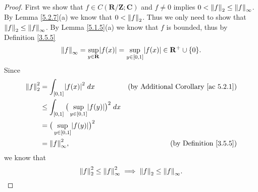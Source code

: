 \begin{proof}
    First we show that \(f \in C(\mathbf{R} / \mathbf{Z} ; \mathbf{C})\) and \(f \neq 0\) implies \(0 < \norm*{f}_2 \leq \norm*{f}_{\infty}\).
    By Lemma \ref{5.2.7}(a) we know that \(0 < \norm*{f}_2\).
    Thus we only need to show that \(\norm*{f}_2 \leq \norm*{f}_\infty\).
    By Lemma \ref{5.1.5}(a) we know that \(f\) is bounded, thus by Definition \ref{3.5.5}
    \[
        \norm*{f}_{\infty} = \sup_{y \in \mathbf{R}} \abs*{f(x)} = \sup_{y \in [0, 1]} \abs*{f(x)} \in \mathbf{R}^+ \cup \{0\}.
    \]
    Since
    \begin{align*}
        \norm*{f}_2^2 & = \int_{[0, 1]} \abs*{f(x)}^2 \; dx                                  & \text{(by Additional Corollary \ref{ac 5.2.1})} \\
                      & \leq \int_{[0, 1]} \big(\sup_{y \in [0, 1]} \abs*{f(y)}\big)^2 \; dx                                                   \\
                      & = \big(\sup_{y \in [0, 1]} \abs*{f(y)}\big)^2                                                                          \\
                      & = \norm*{f}_{\infty}^2,                                              & \text{(by Definition \ref{3.5.5})}
    \end{align*}
    we know that
    \[
        \norm*{f}_2^2 \leq \norm*{f}_{\infty}^2 \implies \norm*{f}_2 \leq \norm*{f}_{\infty}.
    \]


\end{proof}
